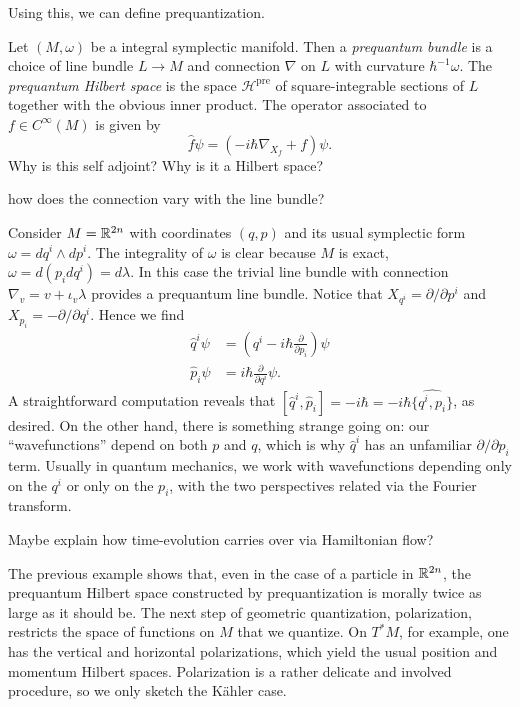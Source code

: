 \documentclass{amsart}
\begin{document}
Using this, we can define prequantization.
\begin{definition}
    Let $(M,\omega)$ be a integral symplectic manifold. Then a \textit{prequantum bundle} is
    a choice of line bundle $L\to M$ and connection $\nabla$
    on $L$ with curvature $\hbar^{-1}\omega$.
    The \textit{prequantum Hilbert space} is the space $\mathcal{H}^\text{pre}$ of square-integrable
    sections of $L$ together with the obvious inner product. The operator associated to $f\in C^\infty(M)$
    is given by
    \begin{equation*}
        \hat f\psi = (-i\hbar\nabla_{X_f} + f)\psi.
    \end{equation*}
    {\color{red} Why is this self adjoint? Why is it a Hilbert space?}
\end{definition}

{\color{red} how does the connection vary with the line bundle?}

\begin{example}
    Consider $M=\mathbb{R}^{2n}$ with coordinates $(q,p)$ and its usual symplectic form $\omega=dq^i\wedge dp^i$.
    The integrality of $\omega$ is clear because $M$ is exact, $\omega=d(p_idq^i)=d\lambda$. In this case
    the trivial line bundle with connection $\nabla_{v}=v+\iota_{v}\lambda$ provides a prequantum
    line bundle. Notice that $X_{q^i}=\partial/\partial p^i$ and $X_{p_i}=-\partial/\partial q^i$.
    Hence we find
    \begin{align*}
        \hat q^i\psi &= \left(q^i -i\hbar \frac{\partial}{\partial p_i}\right)\psi\\
        \hat p_i\psi &= i\hbar\frac{\partial}{\partial q^i}\psi.
    \end{align*}
    A straightforward computation reveals that $[\hat q^i,\hat p_i]=-i\hbar=-i\hbar\widehat{\{q^i,p_i\}}$,
    as desired. On the other hand, there is something strange going on: our ``wavefunctions'' depend
    on both $p$ and $q$, which is why $\hat q^i$ has an unfamiliar $\partial/\partial p_i$ term. 
    Usually in quantum mechanics, we work with wavefunctions depending only on the $q^i$ or only on
    the $p_i$, with the two perspectives related via the Fourier transform.
\end{example}
{\color{red} Maybe explain how time-evolution carries over via Hamiltonian flow?}

The previous example shows that, even in the case of a particle in $\mathbb{R}^{2n}$, the prequantum
Hilbert space constructed by prequantization is morally twice as large as it should be.
The next step of geometric quantization, polarization, restricts the space of functions on $M$
that we quantize. On $T^*M$, for example, one has the vertical and horizontal polarizations,
which yield the usual position and momentum Hilbert spaces. Polarization is a rather delicate
and involved procedure, so we only sketch the K\"ahler case.
\end{document}
